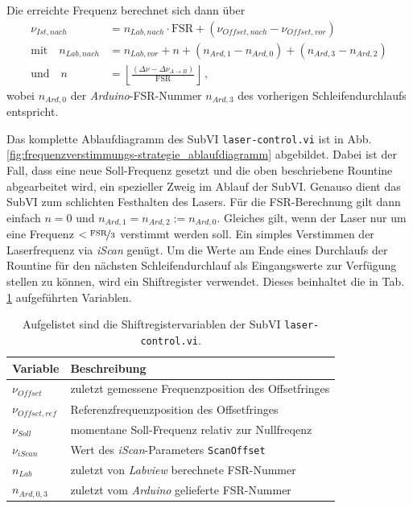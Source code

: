 Die erreichte Frequenz berechnet sich dann über
\begin{equation}\label{eq:neue_frequenz_strategie_2}
	\begin{split}
		\nu_{Ist,nach} &=
		n_{Lab,nach}\cdot\text{FSR}+(\nu_{Offset,nach}-\nu_{Offset,vor})\\
		\text{mit}\quad
		n_{Lab,nach} &= n_{Lab,vor}+n+(n_{Ard,1}-n_{Ard,0})+(n_{Ard,3}-n_{Ard,2})\\
		\text{und}\quad
		n &= \left\lfloor\frac{(\Delta\nu-\Delta\nu_{A\rightarrow
		B})}{\text{FSR}}\right\rfloor\,,
	\end{split}
\end{equation}
wobei $n_{Ard,0}$ der \textit{Arduino}-FSR-Nummer $n_{Ard,3}$ des vorherigen
Schleifendurchlaufs entspricht.\par
Das komplette Ablaufdiagramm des SubVI \lstinline|laser-control.vi| ist in Abb.
\ref{fig:frequenzverstimmungs-strategie_ablaufdiagramm} abgebildet. Dabei ist
der Fall, dass eine neue Soll-Frequenz gesetzt und die oben beschriebene
Rountine abgearbeitet wird, ein spezieller Zweig im Ablauf der SubVI. Genauso
dient das SubVI zum schlichten Festhalten des Lasers. Für die FSR-Berechnung
gilt dann einfach $n=0$ und $n_{Ard,1}=n_{Ard,2}:=n_{Ard,0}$. Gleiches gilt,
wenn der Laser nur um eine Frequenz $<\nicefrac{\text{FSR}}{3}$ verstimmt werden
soll. Ein simples Verstimmen der Laserfrequenz via \textit{iScan} genügt. Um die
Werte am Ende eines Durchlaufs der Rountine für den nächsten Schleifendurchlauf
als Eingangswerte zur Verfügung stellen zu können, wird ein Shiftregister
verwendet.
Dieses beinhaltet die in Tab.
\ref{tab:shiftregister_laserkontrolle} aufgeführten Variablen.
\begin{table}
	\begin{tabular}{p{}p{}}
		\toprule
			Variable & Beschreibung \\
		\midrule[1px]
		\hline
			$\nu_{Offset}$ & zuletzt gemessene Frequenzposition des Offsetfringes\\
			$\nu_{Offset,ref}$ & Referenzfrequenzposition des Offsetfringes\\
			$\nu_{Soll}$ & momentane Soll-Frequenz relativ zur Nullfreqenz\\
			$\nu_{iScan}$ & Wert des \textit{iScan}-Parameters \lstinline|ScanOffset|\\
			$n_{Lab}$ & zuletzt von \textit{Labview} berechnete FSR-Nummer\\
			$n_{Ard,0,3}$ & zuletzt vom \textit{Arduino} gelieferte FSR-Nummer\\
		\bottomrule[1px]
	\end{tabular}
	\caption[Shiftregister -
	\lstinline|laser-control.vi|]{Aufgelistet sind die Shiftregistervariablen der
	SubVI \lstinline|laser-control.vi|.}
	\label{tab:shiftregister_laserkontrolle}
\end{table}
